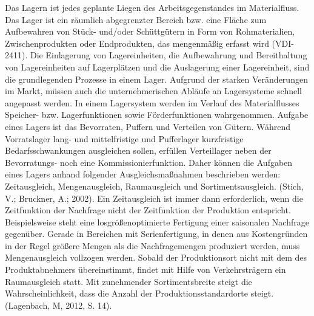 \begin{itemize}
\begin{itemize}
Das Lagern ist jedes geplante Liegen des Arbeitsgegenstandes im Materialfluss.
Das Lager ist ein r\"aumlich abgegrenzter Bereich bzw. eine Fl\"ache zum Aufbewahren von St\"uck- und/oder Sch\"uttg\"utern in Form von Rohmaterialien, Zwischenprodukten oder Endprodukten, das mengenm\"a\ss ig erfasst wird (VDI-2411).
Die Einlagerung von Lagereinheiten, die Aufbewahrung und Bereithaltung von La\-ger\-ein\-hei\-ten auf Lagerpl\"atzen und die Auslagerung einer Lagereinheit, sind die grundlegenden Prozesse in einem Lager.
Aufgrund der starken Ver\"anderungen im Markt, m\"ussen auch die unternehmerischen Abl\"aufe an Lagersysteme schnell angepasst werden.
In einem Lagersystem werden im Verlauf des Materialflusses Speicher- bzw. Lagerfunktionen sowie F\"orderfunktionen wahrgenommen. 
Aufgabe eines Lagers ist das Bevorraten, Puffern und Verteilen von G\"utern.
W\"ahrend Vorratslager lang- und mittelfristige und Pufferlager kurzfristige Bedarfsschwankungen ausgleichen sollen, erf\"ullen Verteillager neben der Bevorratungs- noch eine Kommissionierfunktion.
Daher k\"onnen die Aufgaben eines Lagers anhand folgender Ausgleichsma\ss nahmen beschrieben werden:
Zeitausgleich, Mengenausgleich, Raumausgleich und Sortimentsausgleich. (Stich, V.; Bruckner, A.; 2002).
Ein Zeitausgleich ist immer dann erforderlich, wenn die Zeitfunktion der Nachfrage nicht der Zeitfunktion der Produktion entspricht.
Beispielsweise steht eine losgr\"o\ss enoptimierte Fertigung einer saisonalen Nachfrage gegen\"uber.
Gerade in Bereichen mit Serienfertigung, in denen aus Kostengr\"unden in der Regel gr\"o\ss ere Mengen als die Nachfragemengen produziert werden, muss Mengenausgleich vollzogen werden.
Sobald der Produktionsort nicht mit dem des Produktabnehmers \"ubereinstimmt, findet mit Hilfe von Verkehrstr\"agern ein Raumausgleich statt.
Mit zunehmender Sortimentsbreite steigt die Wahrscheinlichkeit, dass die Anzahl der Produktionsstandardorte steigt. (Lagenbach, M, 2012, S. 14).


\end{itemize}
\end{itemize}
